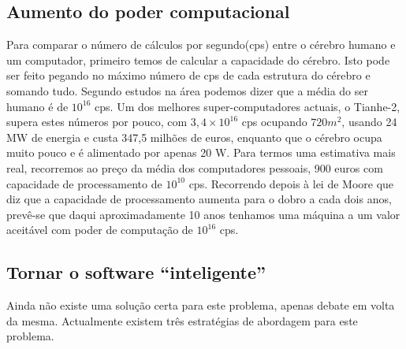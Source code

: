 \documentclass[runningheads,a4paper]{llncs}
\begin{document}
\subsection{Aumento do poder computacional}
Para comparar o número de cálculos por segundo(cps) entre o cérebro humano e um computador, primeiro temos de calcular a capacidade do cérebro. Isto pode ser feito pegando no máximo número de cps de cada estrutura do cérebro e somando tudo.
Segundo estudos na área podemos dizer que a média do ser humano é de $10^{16}$ cps.
Um dos melhores super-computadores actuais, o Tianhe-2, supera estes números por pouco, com $3,4\times10^{16}$ cps ocupando $720 m^{2}$, usando 24 MW de energia e custa 347,5 milhões de euros, enquanto que o cérebro ocupa muito pouco e é alimentado por apenas 20 W.
Para termos uma estimativa mais real, recorremos ao preço da média dos computadores pessoais, 900 euros com capacidade de processamento de $10^{10}$ cps.
Recorrendo depois à lei de Moore que diz que a capacidade de processamento aumenta para o dobro a cada dois anos, prevê-se que daqui aproximadamente 10 anos tenhamos uma máquina a um valor aceitável com poder de computação de $10^{16}$ cps.

\subsection{Tornar o software “inteligente”}

Ainda não existe uma solução certa para este problema, apenas debate em volta da mesma. Actualmente existem três estratégias de abordagem para este problema.
\end{document}
